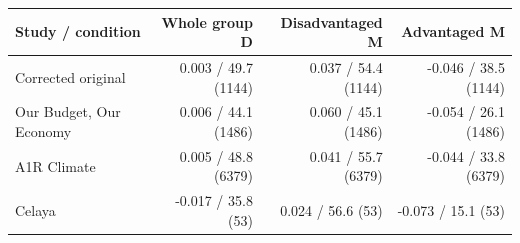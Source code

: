 
\begin{tabular}{lrrr}
\toprule
Study / condition & Whole group D & Disadvantaged M & Advantaged M\\
\midrule
Corrected original & 0.003 / 49.7 (1144) & 0.037 / 54.4 (1144) & -0.046 / 38.5 (1144)\\
Our Budget, Our Economy & 0.006 / 44.1 (1486) & 0.060 / 45.1 (1486) & -0.054 / 26.1 (1486)\\
A1R Climate & 0.005 / 48.8 (6379) & 0.041 / 55.7 (6379) & -0.044 / 33.8 (6379)\\
Celaya & -0.017 / 35.8 (53) & 0.024 / 56.6 (53) & -0.073 / 15.1 (53)\\
\bottomrule
\end{tabular}
